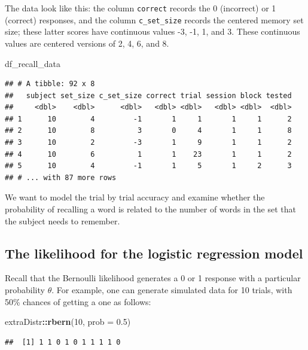 \documentclass[12pt,]{krantz}
\newenvironment{Shaded}{\begin{snugshade}}{\end{snugshade}}
\newcommand{\KeywordTok}[1]{\textcolor[rgb]{0.13,0.29,0.53}{\textbf{#1}}}
\newcommand{\DataTypeTok}[1]{\textcolor[rgb]{0.13,0.29,0.53}{#1}}
\newcommand{\DecValTok}[1]{\textcolor[rgb]{0.00,0.00,0.81}{#1}}
\newcommand{\FloatTok}[1]{\textcolor[rgb]{0.00,0.00,0.81}{#1}}
\newcommand{\OperatorTok}[1]{\textcolor[rgb]{0.81,0.36,0.00}{\textbf{#1}}}
\newcommand{\NormalTok}[1]{#1}
\theoremstyle{definition}
\theoremstyle{definition}
\theoremstyle{definition}
\theoremstyle{remark}
\begin{document}
The data look like this: the column \texttt{correct} records the 0
(incorrect) or 1 (correct) responses, and the column
\texttt{c\_set\_size} records the centered memory set size; these latter
scores have continuous values -3, -1, 1, and 3. These continuous values
are centered versions of 2, 4, 6, and 8.

\begin{Shaded}
\begin{Highlighting}[]
\NormalTok{df_recall_data}
\end{Highlighting}
\end{Shaded}

\begin{verbatim}
## # A tibble: 92 x 8
##   subject set_size c_set_size correct trial session block tested
##     <dbl>    <dbl>      <dbl>   <dbl> <dbl>   <dbl> <dbl>  <dbl>
## 1      10        4         -1       1     1       1     1      2
## 2      10        8          3       0     4       1     1      8
## 3      10        2         -3       1     9       1     1      2
## 4      10        6          1       1    23       1     1      2
## 5      10        4         -1       1     5       1     2      3
## # ... with 87 more rows
\end{verbatim}

We want to model the trial by trial accuracy and examine whether the
probability of recalling a word is related to the number of words in the
set that the subject needs to remember.

\subsection{The likelihood for the logistic regression
model}\label{the-likelihood-for-the-logistic-regression-model}

Recall that the Bernoulli likelihood generates a 0 or 1 response with a
particular probability \(\theta\). For example, one can generate
simulated data for 10 trials, with 50\% chances of getting a one as
follows:

\begin{Shaded}
\begin{Highlighting}[]
\NormalTok{extraDistr}\OperatorTok{::}\KeywordTok{rbern}\NormalTok{(}\DecValTok{10}\NormalTok{, }\DataTypeTok{prob =} \FloatTok{0.5}\NormalTok{)}
\end{Highlighting}
\end{Shaded}

\begin{verbatim}
##  [1] 1 1 0 1 0 1 1 1 1 0
\end{verbatim}
\end{document}
